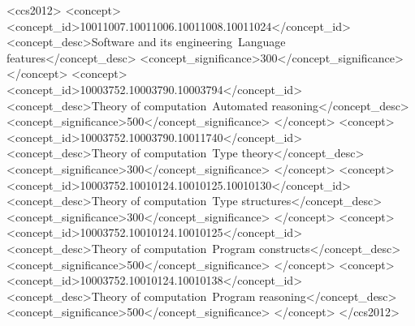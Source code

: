 \begin{CCSXML}
<ccs2012>
   <concept>
       <concept_id>10011007.10011006.10011008.10011024</concept_id>
       <concept_desc>Software and its engineering~Language features</concept_desc>
       <concept_significance>300</concept_significance>
       </concept>
   <concept>
       <concept_id>10003752.10003790.10003794</concept_id>
       <concept_desc>Theory of computation~Automated reasoning</concept_desc>
       <concept_significance>500</concept_significance>
       </concept>
   <concept>
       <concept_id>10003752.10003790.10011740</concept_id>
       <concept_desc>Theory of computation~Type theory</concept_desc>
       <concept_significance>300</concept_significance>
       </concept>
   <concept>
       <concept_id>10003752.10010124.10010125.10010130</concept_id>
       <concept_desc>Theory of computation~Type structures</concept_desc>
       <concept_significance>300</concept_significance>
       </concept>
   <concept>
       <concept_id>10003752.10010124.10010125</concept_id>
       <concept_desc>Theory of computation~Program constructs</concept_desc>
       <concept_significance>500</concept_significance>
       </concept>
   <concept>
       <concept_id>10003752.10010124.10010138</concept_id>
       <concept_desc>Theory of computation~Program reasoning</concept_desc>
       <concept_significance>500</concept_significance>
       </concept>
 </ccs2012>
\end{CCSXML}


